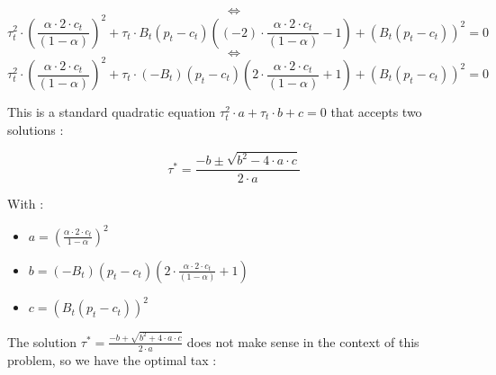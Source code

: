 \documentclass{article}
\begin{document}
$$\iff$$
\begin{equation*}
    \tau_{t}^{2}\cdot\left(\frac{\alpha \cdot 2\cdot c_{t}}{(1-\alpha)}\right)^{2}+\tau_{t}\cdot B_{t}\left(p_{t}-c_{t}\right)\left((-2)\cdot \frac{\alpha \cdot 2\cdot c_{t}}{(1-\alpha)}-1\right)+\left(B_{t}(p_{t}-c_{t})\right)^{2}=0
\end{equation*}
$$\iff$$
\begin{equation*}
    \tau_{t}^{2}\cdot\left(\frac{\alpha \cdot 2\cdot c_{t}}{(1-\alpha)}\right)^{2}+\tau_{t}\cdot \left(-B_{t}\right)\left(p_{t}-c_{t}\right)\left(2\cdot \frac{\alpha \cdot 2\cdot c_{t}}{(1-\alpha)}+1\right)+\left(B_{t}(p_{t}-c_{t})\right)^{2}=0
\end{equation*}

This is a standard quadratic equation $\tau_{t}^{2}\cdot a+\tau_{t}\cdot b + c =0$ that accepts two solutions : 

$$\tau^{*}=\frac{-b\pm\sqrt{b^2-4\cdot a\cdot c}}{2\cdot a}$$

With : 

\begin{itemize}
    \item $a = \left(\frac{\alpha \cdot 2\cdot c_{t}}{1-\alpha}\right)^{2}$
    \item $b = \left(-B_{t}\right)\left(p_{t}-c_{t}\right)\left(2\cdot \frac{\alpha \cdot 2\cdot c_{t}}{(1-\alpha)}+1\right)$
    \item $c = \left(B_{t}(p_{t}-c_{t})\right)^{2}$
\end{itemize}

The solution $\tau^{*}=\frac{-b+\sqrt{b^2+4\cdot a\cdot c}}{2\cdot a}$ does not make sense in the context of this problem, so we have the optimal tax : 
\end{document}
